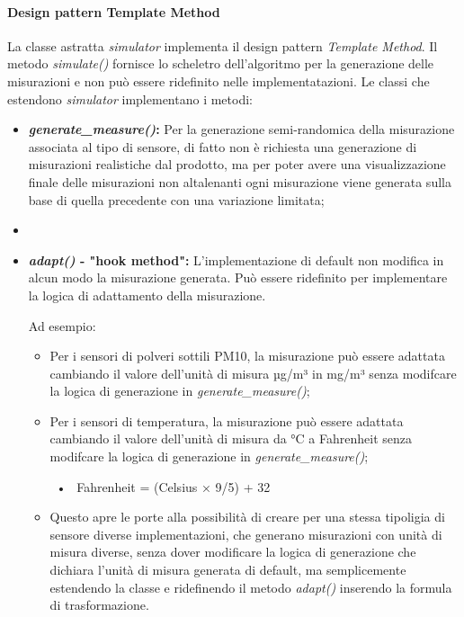 \paragraph{Design pattern Template Method} \label{sec:templateSIM}

La classe astratta \textit{simulator} implementa il design pattern \textit{Template Method}. Il metodo \textit{simulate()} fornisce lo scheletro dell'algoritmo per la generazione delle misurazioni e non può essere ridefinito nelle implementatazioni. Le classi che estendono \textit{simulator} implementano i metodi:
\begin{itemize}
    \item \textbf{\textit{generate\_measure()}:} Per la generazione semi-randomica della misurazione associata al tipo di sensore, di fatto non è richiesta una generazione di misurazioni realistiche dal prodotto, ma per poter avere una visualizzazione finale delle misurazioni non altalenanti ogni misurazione viene generata sulla base di quella precedente con una variazione limitata;
    \item 
    \item \textbf{\textit{adapt()} - "hook method":} L'implementazione di default non modifica in alcun modo la misurazione generata. Può essere ridefinito per implementare la logica di adattamento della misurazione.
    
    Ad esempio:
    \begin{itemize}
        \item Per i sensori di polveri sottili PM10, la misurazione può essere adattata cambiando il valore dell'unità di misura µg/m³ in mg/m³ senza modifcare la logica di generazione in \textit{generate\_measure()};
        
        \item Per i sensori di temperatura, la misurazione può essere adattata cambiando il valore dell'unità di misura da °C a Fahrenheit  senza modifcare la logica di generazione in \textit{generate\_measure()};
        
        ~•~ Fahrenheit = (Celsius × 9/5) + 32
 
        \item Questo apre le porte alla possibilità di creare per una stessa tipoligia di sensore diverse implementazioni, che generano misurazioni con unità di misura diverse, senza dover modificare la logica di generazione che dichiara l'unità di misura generata di default, ma semplicemente estendendo la classe e ridefinendo il metodo \textit{adapt()} inserendo la formula di trasformazione.
        

\end{itemize}
\end{itemize}
